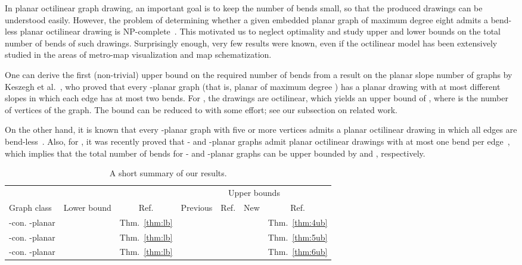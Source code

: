 \documentclass[a4paper,twoside,11pt]{article}
\begin{document}
In planar octilinear graph drawing, an important goal is to keep the
number of bends small, so that the produced drawings can be
understood easily. However, the problem of determining whether a
given embedded planar graph of maximum degree eight admits a
bend-less planar octilinear drawing is
NP-complete~\cite{Noellenburg05}. This motivated us to neglect
optimality and study upper and lower bounds on the total number of
bends of such drawings. Surprisingly enough, very few results were
known, even if the octilinear model has been extensively studied in
the areas of metro-map visualization and map schematization.

One can derive the first (non-trivial) upper bound on the required
number of bends from a result on the planar slope number of graphs
by Keszegh et al.~\cite{KPP13}, who proved that every -planar
graph (that is, planar of maximum degree ) has a planar drawing
with at most  different slopes in which
each edge has at most two bends. For , the drawings
are octilinear, which yields an upper bound of , where  is
the number of vertices of the graph. The bound can be reduced to
 with some effort; see our subsection on related work.

On the other hand, it is known that every -planar graph with five
or more vertices admits a planar octilinear drawing in which all
edges are bend-less~\cite{Kant92,GLM14}. Also, for ,
it was recently proved that - and -planar graphs admit planar
octilinear drawings with at most one bend per edge~\cite{BGKK14},
which implies that the total number of bends for - and -planar
graphs can be upper bounded by  and , respectively.

\begin{table}[t!]
  \centering
  \caption{A short summary of our results.}
  \label{table:results}
  \medskip
  \begin{tabular}{lcccccc}
    \toprule
    & & &\multicolumn{4}{c}{Upper bounds}\\ 
    \cmidrule{4-7}
    Graph class & Lower bound & Ref. & Previous & Ref. & New & Ref.\\
    \midrule 
    -con. -planar &   & Thm.~\ref{thm:lb} &     & \cite{BGKK14} &    & Thm.~\ref{thm:4ub}\\
    -con. -planar &  & Thm.~\ref{thm:lb} &   & \cite{BGKK14} &   & Thm.~\ref{thm:5ub}\\
    -con. -planar &  & Thm.~\ref{thm:lb} &  & \cite{KPP13}  &   & Thm.~\ref{thm:6ub}\\
    \bottomrule
  \end{tabular} 
\end{table}
\end{document}
